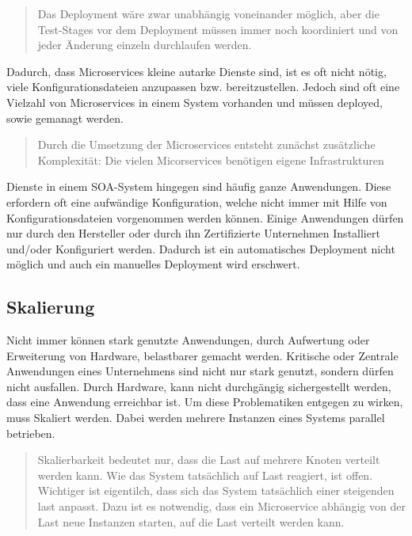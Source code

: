 \begin{quotation}
	\frqq Das Deployment wäre zwar unabhängig voneinander möglich, aber die Test-Stages vor dem Deployment müssen immer noch koordiniert und von jeder Änderung einzeln durchlaufen werden.\flqq\ \cite[S. 19]{EWolff2016:Microservices}
\end{quotation}

Dadurch, dass Microservices kleine autarke Dienste sind, ist es oft nicht nötig, viele Konfigurationsdateien anzupassen bzw. bereitzustellen. Jedoch sind oft eine Vielzahl von Microservices in einem System vorhanden und müssen deployed, sowie gemanagt werden.

\begin{quotation}
	\frqq Durch die Umsetzung der Microservices entsteht zunächst zusätzliche Komplexität: Die vielen Micorservices benötigen eigene Infrastrukturen\flqq\ \cite[S. 18]{EWolff2016:Microservices}
\end{quotation}

Dienste in einem SOA-System hingegen sind häufig ganze Anwendungen. Diese erfordern oft eine aufwändige Konfiguration, welche nicht immer mit Hilfe von Konfigurationsdateien vorgenommen werden können. Einige Anwendungen dürfen nur durch den Hersteller oder durch ihn Zertifizierte Unternehmen Installiert und/oder Konfiguriert werden. Dadurch ist ein automatisches Deployment nicht möglich und auch ein manuelles Deployment wird erschwert.

\subsection{Skalierung}
\label{subsec:Skalierung}
Nicht immer können stark genutzte Anwendungen, durch Aufwertung oder Erweiterung von Hardware, belastbarer gemacht werden. Kritische oder Zentrale Anwendungen eines Unternehmens sind nicht nur stark genutzt, sondern dürfen nicht ausfallen. Durch Hardware, kann nicht durchgängig sichergestellt werden, dass eine Anwendung erreichbar ist. Um diese Problematiken entgegen zu wirken, muss Skaliert werden. Dabei werden mehrere Instanzen eines Systems parallel betrieben.

\begin{quotation}
	\frqq Skalierbarkeit bedeutet nur, dass die Last auf mehrere Knoten verteilt werden kann. Wie das System tatsächlich auf Last reagiert, ist offen. Wichtiger ist eigentilch, dass sich das System tatsächlich einer steigenden last anpasst. Dazu ist es notwendig, dass ein Microservice abhängig von der Last neue Instanzen starten, auf die Last verteilt werden kann.\flqq\ \cite[S. 151]{EWolff2016:Microservices}
\end{quotation}

